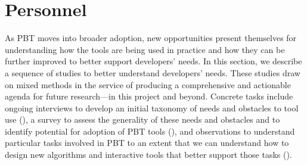 
\section*{Personnel}




\label{sec:foundation}


As PBT moves into broader adoption, new opportunities present
themselves for understanding how
the tools are being used in practice and how they can be further
improved to better support developers' needs. In this section, we describe a
sequence of studies to better understand developers' needs.
These studies draw on mixed methods in the service of producing a
comprehensive and actionable agenda for future research---in this
project and beyond.  Concrete tasks include ongoing interviews to
develop an initial taxonomy of needs and
obstacles to tool use (), a survey to assess the
generality of these needs and obstacles and to identify potential for adoption
of PBT tools (), and observations to understand
particular tasks involved in PBT to an extent that we can understand how to
design new algorithms and interactive tools that better support those tasks
().

\label{sec:interviews}

